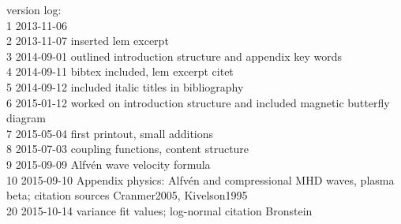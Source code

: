 \begin{titlepage}
\begin{footnotesize}
\noindent version log:\\
1	2013-11-06\\
2	2013-11-07	inserted lem excerpt\\
3	2014-09-01	outlined introduction structure and appendix key words\\
4	2014-09-11	bibtex included, lem excerpt citet\\
5	2014-09-12	included italic titles in bibliography\\
6	2015-01-12	worked on introduction structure and included magnetic butterfly diagram\\
7	2015-05-04	first printout, small additions\\
8	2015-07-03	coupling functions, content structure\\
9	2015-09-09	Alfv\'en wave velocity formula\\
10	2015-09-10	Appendix physics: Alfv\'en and compressional MHD waves, plasma beta; citation sources Cranmer2005, Kivelson1995\\
20	2015-10-14	variance fit values; log-normal citation Bronstein\\

\end{footnotesize}
\end{titlepage}
